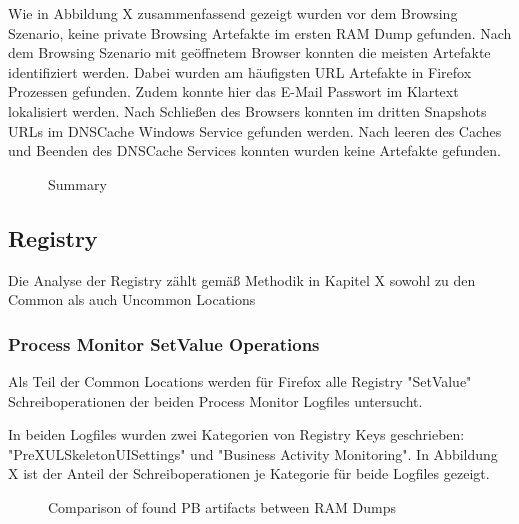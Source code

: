 Wie in Abbildung X zusammenfassend gezeigt wurden vor dem Browsing Szenario, keine private Browsing Artefakte im ersten RAM Dump gefunden.
Nach dem Browsing Szenario mit geöffnetem Browser konnten die meisten Artefakte identifiziert werden. Dabei wurden am häufigsten URL Artefakte in Firefox Prozessen gefunden. Zudem konnte hier das E-Mail Passwort im Klartext lokalisiert werden.
Nach Schließen des Browsers konnten im dritten Snapshots URLs im DNSCache Windows Service gefunden werden. Nach leeren des Caches und Beenden des DNSCache Services konnten wurden keine Artefakte gefunden.
\begin{figure}[h!]
	\centerline{}
	\label{chart:final-criteria}  
	\caption{Summary}
\end{figure}


\subsection*{Registry}

Die Analyse der Registry zählt gemäß Methodik in Kapitel X sowohl zu den Common als auch Uncommon Locations 

\subsubsection*{Process Monitor SetValue Operations}

Als Teil der Common Locations werden für Firefox alle Registry "SetValue" Schreiboperationen der beiden Process Monitor Logfiles untersucht.

In beiden Logfiles wurden zwei Kategorien von Registry Keys geschrieben: "PreXULSkeletonUISettings" und "Business Activity Monitoring". In Abbildung X ist der Anteil der Schreiboperationen je Kategorie für beide Logfiles gezeigt.
\begin{figure}[h!]
	\centerline{}
	\label{chart:final-criteria}  
	\caption{Comparison of found PB artifacts between RAM Dumps}
\end{figure}

